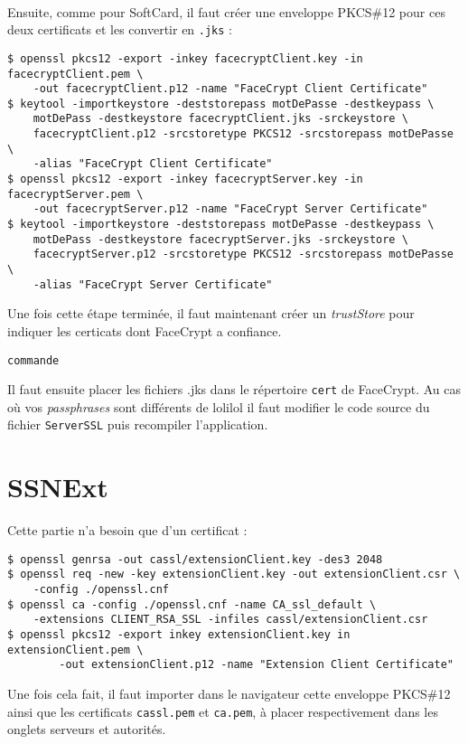 \documentclass[a4paper,10pt]{article}
\begin{document}
\paragraph{}
Ensuite, comme pour SoftCard, il faut créer une enveloppe PKCS\#12 pour ces
deux certificats et les convertir en \texttt{.jks} : 
\begin{verbatim}
$ openssl pkcs12 -export -inkey facecryptClient.key -in facecryptClient.pem \ 
    -out facecryptClient.p12 -name "FaceCrypt Client Certificate"
$ keytool -importkeystore -deststorepass motDePasse -destkeypass \ 
    motDePass -destkeystore facecryptClient.jks -srckeystore \ 
    facecryptClient.p12 -srcstoretype PKCS12 -srcstorepass motDePasse \ 
    -alias "FaceCrypt Client Certificate"
$ openssl pkcs12 -export -inkey facecryptServer.key -in facecryptServer.pem \ 
    -out facecryptServer.p12 -name "FaceCrypt Server Certificate"
$ keytool -importkeystore -deststorepass motDePasse -destkeypass \ 
    motDePass -destkeystore facecryptServer.jks -srckeystore \ 
    facecryptServer.p12 -srcstoretype PKCS12 -srcstorepass motDePasse \ 
    -alias "FaceCrypt Server Certificate"
\end{verbatim}
Une fois cette étape terminée, il faut maintenant créer un \emph{trustStore}
pour indiquer les certicats dont FaceCrypt a confiance.
\begin{verbatim}
commande
\end{verbatim}

Il faut ensuite placer les fichiers .jks dans le répertoire \texttt{cert}
de FaceCrypt. Au cas où vos \emph{passphrases} sont différents de 
\og lolilol \fg{} il faut modifier le code source du fichier 
\texttt{ServerSSL} puis recompiler l'application.

\section{SSNExt}
Cette partie n'a besoin que d'un certificat : 
\begin{verbatim}
$ openssl genrsa -out cassl/extensionClient.key -des3 2048
$ openssl req -new -key extensionClient.key -out extensionClient.csr \
    -config ./openssl.cnf
$ openssl ca -config ./openssl.cnf -name CA_ssl_default \ 
    -extensions CLIENT_RSA_SSL -infiles cassl/extensionClient.csr
$ openssl pkcs12 -export inkey extensionClient.key in extensionClient.pem \
        -out extensionClient.p12 -name "Extension Client Certificate"
\end{verbatim}
Une fois cela fait, il faut importer dans le navigateur cette enveloppe 
PKCS\#12 ainsi que les certificats \texttt{cassl.pem} et \texttt{ca.pem}, 
à placer respectivement dans les onglets serveurs et autorités.
\end{document}
